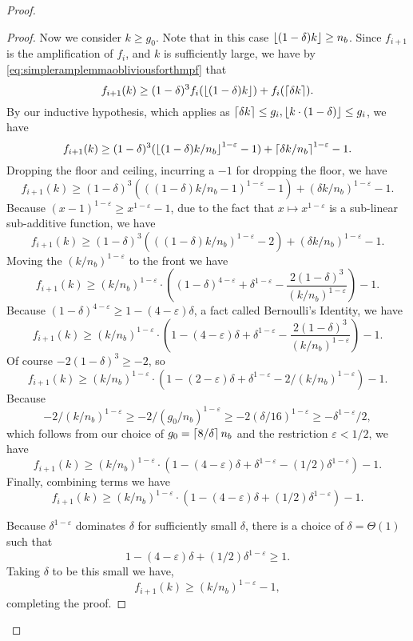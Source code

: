 \begin{proof}
{\begin{proof}
  Now we consider $k \ge g_0$. Note that in this case $\left\lfloor (1-\delta)k \right\rfloor \ge n_b$.
  Since $f_{i+1}$ is the amplification of $f_i$, and $k$ is sufficiently large, we have by \eqref{eq:simpleramplemmaobliviousforthmpf} that
  $$f_{i+1}(k) \ge (1-\delta)^3 f_i(\left\lfloor (1-\delta)k \right\rfloor) + f_i(\left\lceil \delta k \right\rceil).$$
  By our inductive hypothesis, which applies as $\left\lceil \delta k \right\rceil\le g_i, \left\lfloor k\cdot (1-\delta) \right\rfloor \le g_i$, we have
  $$f_{i+1}(k) \ge (1-\delta)^3 (\left\lfloor (1-\delta)k/n_b \right\rfloor^{1-\varepsilon}-1) + \left\lceil \delta k/n_b \right\rceil^{1-\varepsilon} - 1. $$
  Dropping the floor and ceiling, incurring a $-1$ for dropping the floor, we have
  $$f_{i+1}(k) \ge (1-\delta)^3 (((1-\delta)k/n_b-1)^{1-\varepsilon}-1) + (\delta k/n_b)^{1-\varepsilon} - 1.$$
  Because $(x-1)^{1-\varepsilon} \ge x^{1-\varepsilon} -1$, due to the
  fact that $x\mapsto x^{1-\varepsilon}$ is a sub-linear
  sub-additive function, we have 
  $$f_{i+1}(k) \ge (1-\delta)^3 (((1-\delta)k/n_b)^{1-\varepsilon}-2) + (\delta k/n_b)^{1-\varepsilon}-1.$$
  Moving the $(k/n_b)^{1-\varepsilon}$ to the front we have
  $$ f_{i+1}(k) \ge (k/n_b)^{1-\varepsilon} \cdot\left((1-\delta)^{4-\varepsilon} + \delta^{1-\varepsilon} - \frac{2(1-\delta)^3}{(k/n_b)^{1-\varepsilon}} \right) -1.$$
  Because $(1-\delta)^{4-\varepsilon} \ge 1-(4-\varepsilon)\delta$, a fact called Bernoulli's Identity, we have
  $$f_{i+1}(k) \ge (k/n_b)^{1-\varepsilon} \cdot\left(1-(4-\varepsilon)\delta + \delta^{1-\varepsilon} - \frac{2(1-\delta)^3}{(k/n_b)^{1-\varepsilon}} \right)-1.$$
  Of course $-2(1-\delta)^3 \ge -2$, so 
  $$f_{i+1}(k) \ge (k/n_b)^{1-\varepsilon} \cdot\left(1-(2-\varepsilon)\delta + \delta^{1-\varepsilon} - 2/(k/n_b)^{1-\varepsilon} \right) -1.$$
  Because $$-2/(k/n_b)^{1-\varepsilon} \ge -2/(g_0/n_b)^{1-\varepsilon} \ge
  -2(\delta/16)^{1-\varepsilon} \ge -\delta^{1-\varepsilon}/2,$$
  which follows from our choice of $g_0 = \left\lceil 8/\delta \right\rceil n_b$ and the restriction
  $\varepsilon<1/2$, we have 
  $$f_{i+1}(k) \ge (k/n_b)^{1-\varepsilon} \cdot\left(1-(4-\varepsilon)\delta + \delta^{1-\varepsilon} - (1/2)\delta^{1-\varepsilon} \right)-1.$$
  Finally, combining terms we have
  $$f_{i+1}(k) \ge  (k/n_b)^{1-\varepsilon} \cdot\left(1-(4-\varepsilon)\delta + (1/2)\delta^{1-\varepsilon}\right)-1. $$

  Because $\delta^{1-\varepsilon}$ dominates $\delta$ for
  sufficiently small $\delta$, there is a choice of
  $\delta=\Theta(1)$ such that 
  $$1-(4-\varepsilon)\delta + (1/2)\delta^{1-\varepsilon} \ge 1.$$ 
  Taking $\delta$ to be this small we have,
  $$f_{i+1}(k) \ge (k/n_b)^{1-\varepsilon}-1,$$
  completing the proof. 
  \end{proof}

}
\end{proof}
